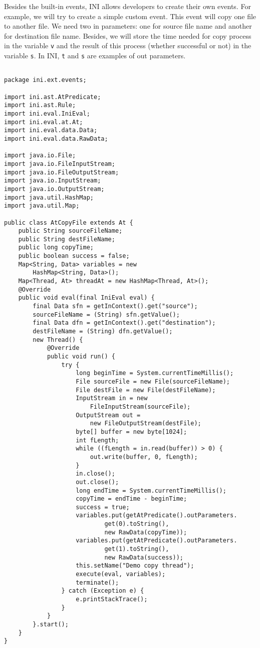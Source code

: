 \documentclass[11pt]{report}
\begin{document}
Besides the built-in events, INI allows developers to create their own events. For example, we will try to create a simple custom event. This event will copy one file to another file. We need two in parameters: one for source file name and another for destination file name. Besides, we will store the time needed for copy process in the variable \texttt{v} and the result of this process (whether successful or not) in the variable \texttt{s}. In INI, \texttt{t} and \texttt{s} are examples of out parameters.
\begin{lstlisting}

package ini.ext.events;

import ini.ast.AtPredicate;
import ini.ast.Rule;
import ini.eval.IniEval;
import ini.eval.at.At;
import ini.eval.data.Data;
import ini.eval.data.RawData;

import java.io.File;
import java.io.FileInputStream;
import java.io.FileOutputStream;
import java.io.InputStream;
import java.io.OutputStream;
import java.util.HashMap;
import java.util.Map;

public class AtCopyFile extends At {
	public String sourceFileName;
	public String destFileName;
	public long copyTime;
	public boolean success = false;
	Map<String, Data> variables = new 
        HashMap<String, Data>();
	Map<Thread, At> threadAt = new HashMap<Thread, At>();
	@Override
	public void eval(final IniEval eval) {
		final Data sfn = getInContext().get("source");
		sourceFileName = (String) sfn.getValue();
		final Data dfn = getInContext().get("destination");
		destFileName = (String) dfn.getValue();
		new Thread() {
			@Override
			public void run() {
				try {
					long beginTime = System.currentTimeMillis();
					File sourceFile = new File(sourceFileName);
					File destFile = new File(destFileName);
					InputStream in = new 
                        FileInputStream(sourceFile);
					OutputStream out = 
                        new FileOutputStream(destFile);
					byte[] buffer = new byte[1024];
					int fLength;
					while ((fLength = in.read(buffer)) > 0) {
						out.write(buffer, 0, fLength);
					}
					in.close();
					out.close();
					long endTime = System.currentTimeMillis();
					copyTime = endTime - beginTime;
					success = true;
					variables.put(getAtPredicate().outParameters.
                            get(0).toString(),
							new RawData(copyTime));
					variables.put(getAtPredicate().outParameters.
                            get(1).toString(),
							new RawData(success));
					this.setName("Demo copy thread");
					execute(eval, variables);
					terminate();
				} catch (Exception e) {
					e.printStackTrace();
				}
			}
		}.start();
	}
}
\end{lstlisting}
\end{document}
